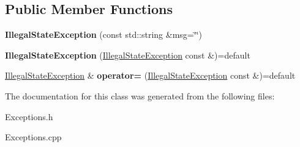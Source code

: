 \subsection*{Public Member Functions}
\begin{DoxyCompactItemize}
\item 
\mbox{\label{classantlr4_1_1IllegalStateException_a88dc2fc4eb7b307c49ee3a45e4eb9d22}} 
{\bfseries Illegal\+State\+Exception} (const std\+::string \&msg=\char`\"{}\char`\"{})
\item 
\mbox{\label{classantlr4_1_1IllegalStateException_a5b88f5a1291d24f7bc0ac3f1e216f0cd}} 
{\bfseries Illegal\+State\+Exception} (\hyperlink{classantlr4_1_1IllegalStateException}{Illegal\+State\+Exception} const \&)=default
\item 
\mbox{\label{classantlr4_1_1IllegalStateException_a293a0fbef0d126de5a178424cb17dbec}} 
\hyperlink{classantlr4_1_1IllegalStateException}{Illegal\+State\+Exception} \& {\bfseries operator=} (\hyperlink{classantlr4_1_1IllegalStateException}{Illegal\+State\+Exception} const \&)=default
\end{DoxyCompactItemize}


The documentation for this class was generated from the following files\+:\begin{DoxyCompactItemize}
\item 
Exceptions.\+h\item 
Exceptions.\+cpp\end{DoxyCompactItemize}
